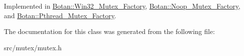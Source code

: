 Implemented in \hyperlink{classBotan_1_1Win32__Mutex__Factory_a855c31568ce9b88459b7ffa62be9ad32}{Botan\-::\-Win32\-\_\-\-Mutex\-\_\-\-Factory}, \hyperlink{classBotan_1_1Noop__Mutex__Factory_a379db5370f5bb5cb504c0fdac8c75f86}{Botan\-::\-Noop\-\_\-\-Mutex\-\_\-\-Factory}, and \hyperlink{classBotan_1_1Pthread__Mutex__Factory_af84295085dc037e93683509280081cd1}{Botan\-::\-Pthread\-\_\-\-Mutex\-\_\-\-Factory}.



The documentation for this class was generated from the following file\-:\begin{DoxyCompactItemize}
\item 
src/mutex/mutex.\-h\end{DoxyCompactItemize}
